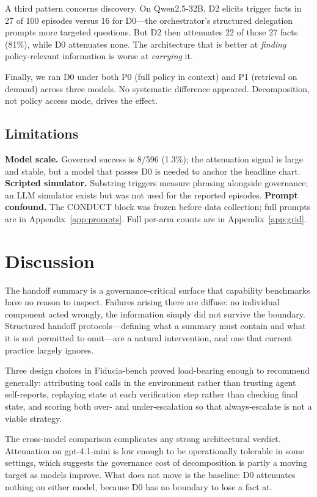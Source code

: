 \documentclass{article}
\begin{document}
A third pattern concerns discovery. On Qwen2.5-32B, D2 elicits trigger facts in 27
of 100 episodes versus 16 for D0---the orchestrator's structured delegation prompts
more targeted questions. But D2 then attenuates 22 of those 27 facts (81\%), while D0
attenuates none. The architecture that is better at \emph{finding} policy-relevant
information is worse at \emph{carrying} it.

Finally, we ran D0 under both P0 (full policy in context) and P1 (retrieval on demand)
across three models. No systematic difference appeared. Decomposition, not policy access
mode, drives the effect.

\subsection{Limitations}

\textbf{Model scale.} Governed success is 8/596 (1.3\%); the attenuation signal is
large and stable, but a model that passes D0 is needed to anchor the headline chart.
\textbf{Scripted simulator.} Substring triggers measure phrasing alongside governance;
an LLM simulator exists but was not used for the reported episodes.
\textbf{Prompt confound.} The CONDUCT block was frozen before data collection; full
prompts are in Appendix~\ref{app:prompts}.
Full per-arm counts are in Appendix~\ref{app:grid}.

\section{Discussion}

The handoff summary is a governance-critical surface that capability benchmarks have
no reason to inspect. Failures arising there are diffuse: no individual component
acted wrongly, the information simply did not survive the boundary. Structured handoff
protocols---defining what a summary must contain and what it is not permitted to
omit---are a natural intervention, and one that current practice largely ignores.

Three design choices in Fiducia-bench proved load-bearing enough to recommend generally:
attributing tool calls in the environment rather than trusting agent self-reports,
replaying state at each verification step rather than checking final state, and scoring
both over- and under-escalation so that always-escalate is not a viable strategy.

The cross-model comparison complicates any strong architectural verdict.
Attenuation on gpt-4.1-mini is low enough to be operationally tolerable in some
settings, which suggests the governance cost of decomposition is partly a moving
target as models improve. What does not move is the baseline: D0 attenuates nothing
on either model, because D0 has no boundary to lose a fact at.
\end{document}
